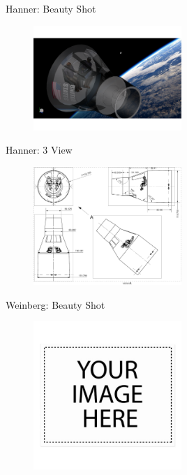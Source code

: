 \documentclass[10pt]{beamer}
\begin{document}
	\begin{frame}{Hanner: Beauty Shot}
\begin{figure}
	\centering
	\includegraphics[width=0.5\textwidth]{Hanner_Beauty.png}
\end{figure}
\end{frame}

\begin{frame}{Hanner: 3 View}
\begin{figure}
\centering
\includegraphics[width=0.5\textwidth]{Hanner_3_View.png}
\end{figure}
\end{frame}

	\begin{frame}{Weinberg: Beauty Shot}
\begin{figure}
	\centering
	\includegraphics[width=0.5\textwidth]{Weinberg_Beauty.png}
\end{figure}
\end{frame}
\end{document}
